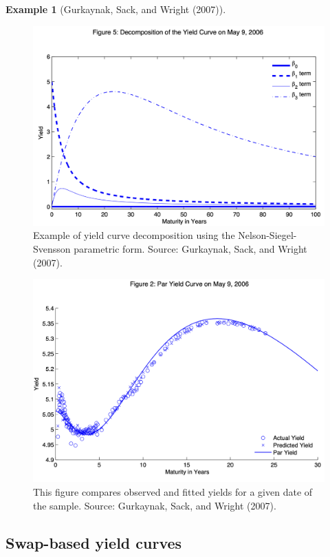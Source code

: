 \documentclass[
  12pt,
]{book}
\theoremstyle{definition}
\theoremstyle{definition}
\newtheorem{example}{Example}[chapter]
\theoremstyle{definition}
\theoremstyle{definition}
\theoremstyle{remark}
\begin{document}
\begin{example}[Gurkaynak, Sack, and Wright (2007)]
\begin{figure}
{\centering \includegraphics[width=0.9\linewidth]{figures/Fig_NSS} 

}

\caption{Example of yield curve decomposition using the Nelson-Siegel-Svensson parametric form. Source: Gurkaynak, Sack, and Wright (2007).}\label{fig:FigNSS}
\end{figure}

\begin{figure}

{\centering \includegraphics[width=0.9\linewidth]{figures/Fig_TSpar} 

}

\caption{This figure compares observed and fitted yields for a given date of the sample. Source: Gurkaynak, Sack, and Wright (2007).}\label{fig:Paryds}
\end{figure}

\end{example}

\hypertarget{swap-based-yield-curves}{%
\subsection{Swap-based yield curves}\label{swap-based-yield-curves}}
\end{document}
